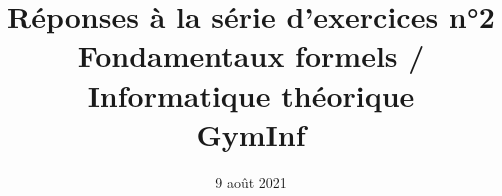 \documentclass[12pt,french,a4paper]{article}
\begin{document}
\title{\vspace{-2cm}Réponses à la série d'exercices n°2\\\large{Fondamentaux formels / Informatique théorique\\GymInf}}
\date{\vspace{-1cm}9 août 2021}

\maketitle

\begin{question}
\begin{enumerate}

\end{enumerate}
\end{question}


\begin{question}
\begin{enumerate}

\end{enumerate}
\end{question}

\begin{question}
\begin{enumerate}

\end{enumerate}
\end{question}

\begin{question}
\begin{enumerate}

\end{enumerate}
\end{question}
\end{document}
